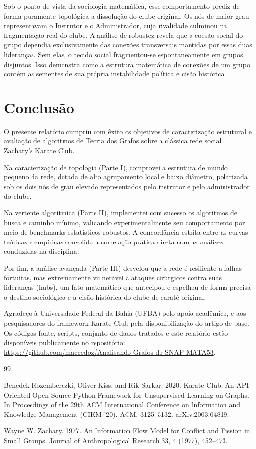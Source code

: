 \documentclass[sigconf]{webmedia}
\begin{document}
Sob o ponto de vista da sociologia matemática, esse comportamento prediz de forma puramente topológica a dissolução do clube original. Os nós de maior grau representavam o Instrutor e o Administrador, cuja rivalidade culminou na fragmentação real do clube. A análise de robustez revela que a coesão social do grupo dependia exclusivamente das conexões transversais mantidas por essas duas lideranças. Sem elas, o tecido social fragmentou-se espontaneamente em grupos disjuntos. Isso demonstra como a estrutura matemática de conexões de um grupo contém as sementes de sua própria instabilidade política e cisão histórica.

\section{Conclusão}

O presente relatório cumpriu com êxito os objetivos de caracterização estrutural e avaliação de algoritmos de Teoria dos Grafos sobre a clássica rede social  {Zachary's Karate Club}.

Na caracterização de topologia (Parte I), comprovei a estrutura de mundo pequeno da rede, dotada de alto agrupamento local e baixo diâmetro, polarizada sob os dois nós de grau elevado representados pelo instrutor e pelo administrador do clube.

Na vertente algorítmica (Parte II), implementei com sucesso os algoritmos de busca e caminho mínimo, validando experimentalmente seu comportamento por meio de benchmarks estatísticos robustos. A concordância estrita entre as curvas teóricas e empíricas consolida a correlação prática direta com as análises conduzidas na disciplina.

Por fim, a análise avançada (Parte III) desvelou que a rede é resiliente a falhas fortuitas, mas extremamente vulnerável a ataques cirúrgicos contra suas lideranças (hubs), um fato matemático que antecipou e espelhou de forma precisa o destino sociológico e a cisão histórica do clube de caratê original.

\begin{acks}
  Agradeço à Universidade Federal da Bahia (UFBA) pelo apoio acadêmico, e aos pesquisadores do framework  {Karate Club} pela disponibilização do artigo de base. Os códigos-fonte, scripts, conjunto de dados tratados e este relatório estão disponíveis publicamente no repositório: \url{https://github.com/maccedoz/Analisando-Grafos-do-SNAP-MATA53}.
\end{acks}

\begin{thebibliography}{99}

Benedek Rozemberczki, Oliver Kiss, and Rik Sarkar. 2020. Karate Club: An API Oriented Open-Source Python Framework for Unsupervised Learning on Graphs. In  {Proceedings of the 29th ACM International Conference on Information and Knowledge Management (CIKM '20)}. ACM, 3125--3132. arXiv:2003.04819.

Wayne W. Zachary. 1977. An Information Flow Model for Conflict and Fission in Small Groups.  {Journal of Anthropological Research} 33, 4 (1977), 452--473.

\end{thebibliography}
\end{document}
